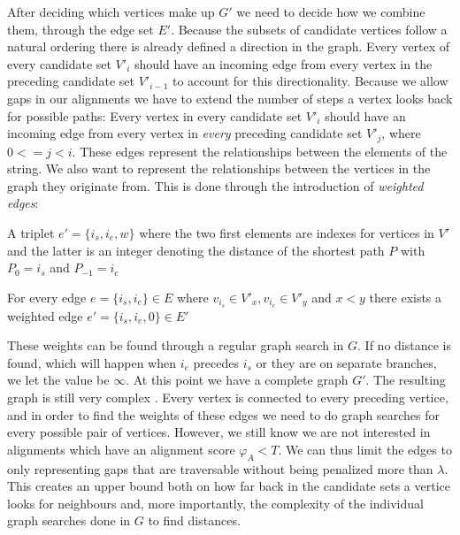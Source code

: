 \documentclass[thesis.tex]{subfiles}
\begin{document}
\par\noindent
After deciding which vertices make up $G'$ we need to decide how we combine them, through the edge set $E'$. Because the subsets of candidate vertices follow a natural ordering there is already defined a direction in the graph. Every vertex of every candidate set $V'_i$ should have an incoming edge from every vertex in the preceding candidate set $V'_{i-1}$ to account for this directionality. Because we allow gaps in our alignments we have to extend the number of steps a vertex looks back for possible paths: Every vertex in every candidate set $V'_i$ should have an incoming edge from every vertex in \textit{every} preceding candidate set $V'_{j}$, where $0<=j<i$. These edges represent the relationships between the elements of the string. We also want to represent the relationships between the vertices in the graph they originate from. This is done through the introduction of \textit{weighted edges}:
\begin{defn}
  A triplet $e'=\{i_s, i_e, w\}$ where the two first elements are indexes for vertices in $V'$ and the latter is an integer denoting the distance of the shortest path $P$ with $P_0=i_s$ and $P_{-1}=i_e$
\end{defn}
\begin{corollary}
  For every edge $e=\{i_s, i_e\} \in E$ where $v_{i_s} \in V'_x, v_{i_e} \in V'_y$ and $x<y$ there exists a weighted edge $e'=\{i_s, i_e, 0\} \in E'$
\end{corollary}
\noindent
These weights can be found through a regular graph search in $G$. If no distance is found, which will happen when $i_e$ precedes $i_s$ or they are on separate branches, we let the value be $\infty$. At this point we have a complete graph $G'$.
\noindent
The resulting graph is still very complex . Every vertex is connected to every preceding vertice, and in order to find the weights of these edges we need to do graph searches for every possible pair of vertices. However, we still know we are not interested in alignments which have an alignment score $\varphi_A < T$. We can thus limit the edges to only representing gaps that are traversable without being penalized more than $\lambda$. This creates an upper bound both on how far back in the candidate sets a vertice looks for neighbours and, more importantly, the complexity of the individual graph searches done in $G$ to find distances.
\end{document}
